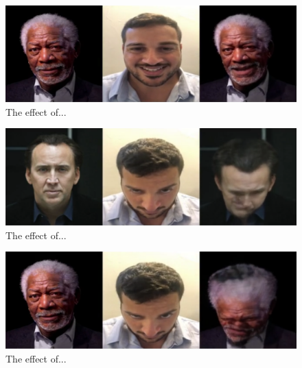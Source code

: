 \documentclass[english,12pt]{article}
\begin{document}
\begin{figure}[htb]
  \begin{centering}
      \includegraphics[scale=0.29]{images/‏‏Amit_smile_freeman.PNG}
  \par\end{centering}
  \caption{\label{fig:Amit_smile_freeman}The effect of...}
\end{figure}

\begin{figure}[htb]
  \begin{centering}
      \includegraphics[scale=0.29]{images/‏‏Amit_tilt1_cage.PNG}
  \par\end{centering}
  \caption{\label{fig:Amit_tilt1_cage}The effect of...}
\end{figure}

\begin{figure}[htb]
  \begin{centering}
      \includegraphics[scale=0.29]{images/‏‏Amit_tilt1_freeman.PNG}
  \par\end{centering}
  \caption{\label{fig:Amit_tilt1_freeman}The effect of...}
\end{figure}
\end{document}

